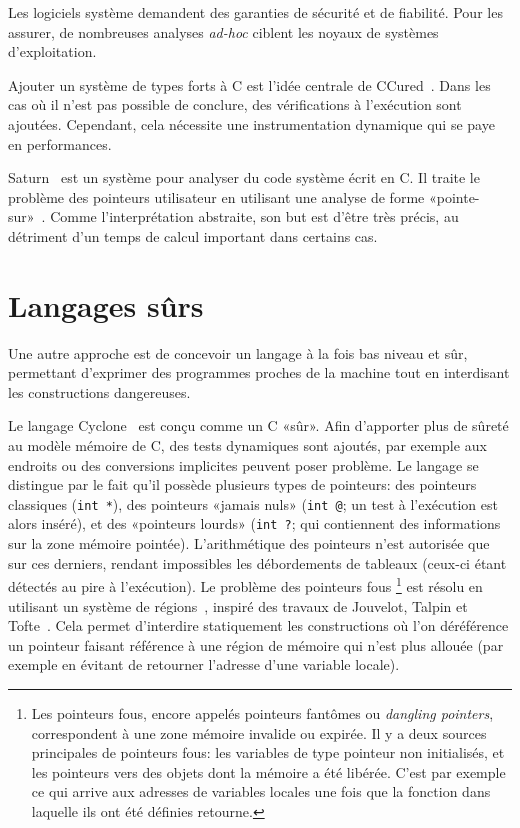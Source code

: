 Les logiciels système demandent des garanties de sécurité et de fiabilité. Pour
les assurer, de nombreuses analyses \emph{ad-hoc} ciblent les noyaux de systèmes
d'exploitation.

Ajouter un système de types forts à C est l'idée centrale de
CCured~\cite{ccured-toplas}. Dans les cas où il n'est pas possible de conclure,
des vérifications à l'exécution sont ajoutées. Cependant, cela nécessite une
instrumentation dynamique qui se paye en performances.

Saturn~\cite{paste07} est un système pour analyser du code système écrit en C.
Il traite le problème des pointeurs utilisateur en utilisant une analyse de
forme «pointe-sur»~\cite{oakland08}. Comme l'interprétation abstraite, son but
est d'être très précis, au détriment d'un temps de calcul important dans
certains cas.


\section{Langages sûrs}

Une autre approche est de concevoir un langage à la fois bas niveau et sûr,
permettant d'exprimer des programmes proches de la machine tout en interdisant
les constructions dangereuses.

Le langage Cyclone~\cite{cyclone-safety} est conçu comme un C «sûr». Afin
d'apporter plus de sûreté au modèle mémoire de C, des tests dynamiques sont
ajoutés, par exemple aux endroits ou des conversions implicites peuvent poser
problème. Le langage se distingue par le fait qu'il possède plusieurs types de
pointeurs: des pointeurs classiques (\texttt{int *}), des pointeurs «jamais
nuls» (\texttt{int @}; un test à l'exécution est alors inséré), et des
«pointeurs lourds» (\verb!int ?!; qui contiennent des informations sur la zone
mémoire pointée). L'arithmétique des pointeurs n'est autorisée que sur ces
derniers, rendant impossibles les débordements de tableaux (ceux-ci étant
détectés au pire à l'exécution). Le problème des pointeurs fous
\footnote{
    Les pointeurs fous, encore appelés pointeurs fantômes ou \emph{dangling
    pointers}, correspondent à une zone mémoire invalide ou expirée. Il y a deux
    sources principales de pointeurs fous: les variables de type pointeur non
    initialisés, et les pointeurs vers des objets dont la mémoire a été libérée.
    C'est par exemple ce qui arrive aux adresses de variables locales une fois
    que la fonction dans laquelle ils ont été définies retourne.
}
est résolu en utilisant un système de régions~\cite{cyclone-regions}, inspiré
des travaux de Jouvelot, Talpin et \linebreak
Tofte~\cite{jfp92,ToTa1993,popl94}. Cela permet d'interdire statiquement les
constructions où l'on déréférence un pointeur faisant référence à une région de
mémoire qui n'est plus allouée (par exemple en évitant de retourner l'adresse
d'une variable locale).

